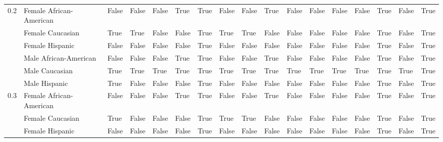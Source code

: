 \begin{tabular}{lllllllllllllllll}
0.2 & Female African-American &       False &       False &          False &        True &              True &       False &           False &        True &         False &               False &       False &                  False &           True &                False &        True \\
    & Female Caucasian &        True &        True &          False &       False &              True &        True &            True &       False &         False &               False &       False &                  False &           True &                False &        True \\
    & Female Hispanic &       False &       False &          False &       False &              True &       False &           False &       False &         False &               False &       False &                  False &           True &                False &        True \\
    & Male African-American &       False &       False &          False &        True &              True &       False &           False &        True &         False &               False &       False &                  False &           True &                False &        True \\
    & Male Caucasian &        True &        True &           True &        True &              True &        True &            True &        True &          True &                True &        True &                   True &           True &                 True &        True \\
    & Male Hispanic &        True &       False &          False &       False &              True &       False &           False &       False &         False &               False &       False &                  False &           True &                False &        True \\
0.3 & Female African-American &       False &       False &          False &        True &              True &       False &           False &        True &         False &               False &       False &                  False &           True &                False &        True \\
    & Female Caucasian &        True &       False &          False &       False &              True &        True &            True &       False &         False &               False &       False &                  False &           True &                False &        True \\
    & Female Hispanic &       False &       False &          False &       False &              True &       False &           False &       False &         False &               False &       False &                  False &           True &                False &        True \\

\end{tabular}
